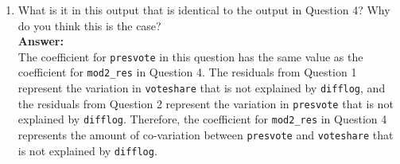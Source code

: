 \documentclass[12pt,letterpaper]{article}
\begin{document}
\begin{enumerate}
		\item What is it in this output that is identical to the output in Question 4? Why do you think this is the case?\\
		
		\textbf{Answer:}\\
		
		The coefficient for \texttt{presvote} in this question has the same value as the coefficient for \texttt{mod2\_res} in Question 4. The residuals from Question 1 represent the variation in \texttt{voteshare} that is not explained by \texttt{difflog}, and the residuals from Question 2 represent the variation in \texttt{presvote} that is not explained by \texttt{difflog}. Therefore, the coefficient for \texttt{mod2\_res} in Question 4 represents the amount of co-variation between \texttt{presvote} and \texttt{voteshare} that is not explained by \texttt{difflog}.
		
	\end{enumerate}
\end{document}
